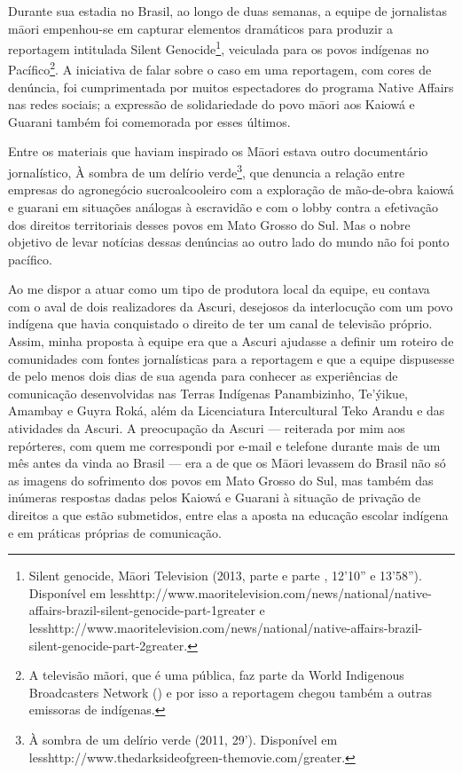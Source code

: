 {{Durante sua estadia no Brasil, ao longo de duas semanas, a equipe de
jornalistas m\=aori empenhou-se em capturar elementos dramáticos para
produzir a reportagem intitulada Silent Genocide\footnote{Silent
genocide, M\=aori Television (2013, parte  e parte ,
12'10'' e
13'58''). Disponível %
em
{less}http://www.maoritelevision.com/news/national/native-affairs-brazil-silent-genocide-part-1{greater}
e
{less}http://www.maoritelevision.com/news/national/native-affairs-brazil-silent-genocide-part-2{greater}.},
veiculada para os povos indígenas no Pacífico\footnote{A televisão
mãori, que é uma  pública, faz parte da World Indigenous Broadcasters
Network () e por isso a reportagem chegou também a outras
emissoras de  indígenas. }. A iniciativa de falar sobre o caso em uma
reportagem, com cores de denúncia, foi cumprimentada por muitos
espectadores do programa Native Affairs nas redes sociais; a expressão
de solidariedade do povo m\=aori aos Kaiowá e Guarani também foi
comemorada por esses últimos.

Entre os materiais que haviam inspirado os M\=aori estava outro
documentário jornalístico, À sombra de um delírio verde\footnote{À
sombra de um delírio verde (2011, 29’). Disponível em
{less}http://www.thedarksideofgreen-themovie.com/{greater}.},
que denuncia a relação entre empresas do agronegócio sucroalcooleiro
com a exploração de mão-de-obra kaiowá e guarani em situações análogas
à escravidão e com o lobby contra a efetivação dos direitos
territoriais desses povos em Mato Grosso do Sul. Mas o nobre objetivo
de levar notícias dessas denúncias ao outro lado do mundo não foi ponto
pacífico.

Ao me dispor a atuar como um tipo de produtora local da equipe, eu
contava com o aval de dois realizadores da Ascuri, desejosos da
interlocução com um povo indígena que havia conquistado o direito de
ter um canal de televisão próprio. Assim, minha proposta à equipe era
que a Ascuri ajudasse a definir um roteiro de comunidades com fontes
jornalísticas para a reportagem e que a equipe dispusesse de pelo menos
dois dias de sua agenda para conhecer as experiências de comunicação
desenvolvidas nas Terras Indígenas Panambizinho, Te’ýikue, Amambay e
Guyra Roká, além da Licenciatura Intercultural Teko Arandu e das
atividades da Ascuri. A preocupação da Ascuri --- reiterada por mim aos
repórteres, com quem me correspondi por e-mail e telefone durante mais
de um mês antes da vinda ao Brasil --- era a de que os M\=aori levassem
do Brasil não só as imagens do sofrimento dos povos em Mato Grosso do
Sul, mas também das inúmeras respostas dadas pelos Kaiowá e Guarani à
situação de privação de direitos a que estão submetidos, entre elas a
aposta na educação escolar indígena e em práticas próprias de
comunicação. 

}}
